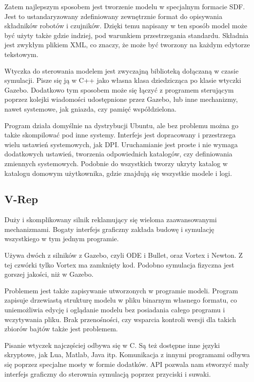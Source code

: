 Zatem najlepszym sposobem jest tworzenie modelu w specjalnym formacie SDF. Jest to ustandaryzowany zdefiniowany zewnętrznie format do opisywania składników robotów i czujników.
Dzięki temu napisany w ten sposób model może być użyty także gdzie indziej, pod warunkiem przestrzegania standardu.
Składnia jest zwykłym plikiem XML, co znaczy, że może być tworzony na każdym edytorze tekstowym.

Wtyczka do sterowania modelem jest zwyczajną biblioteką dołączaną w czasie symulacji. 
Pisze się ją w C++ jako własna klasa dziedzicząca po klasie wtyczki Gazebo.
Dodatkowo tym sposobem może się łączyć z programem sterującym poprzez kolejki wiadomości udostępnione przez Gazebo, lub inne mechanizmy, nawet systemowe, jak gniazda, czy pamięć współdzielona.

Program działa domyślnie na dystrybucji Ubuntu, ale bez problemu można go także skompilować pod inne systemy.
Interfejs jest dopracowany i przestrzega wielu ustawień systemowych, jak DPI.
Uruchamianie jest proste i nie wymaga dodatkowych ustawień, tworzenia odpowiednich katalogów, czy definiowania zmiennych systemowych.
Podobnie do wszystkich tworzy ukryty katalog w katalogu domowym użytkownika, gdzie znajdują się wszystkie modele i logi.

\subsection{V-Rep}
Duży i skomplikowany silnik reklamujący się wieloma zaawansowanymi mechanizmami.
Bogaty interfejs graficzny zakłada budowę i symulację wszystkiego w tym jednym programie.

Używa dwóch z silników z Gazebo, czyli ODE i Bullet, oraz Vortex i Newton. Z tej czwórki tylko Vortex ma zamknięty kod.
Podobno symulacja fizyczna jest gorszej jakości, niż w Gazebo.

Problemem jest także zapisywanie utworzonych w programie modeli.
Program zapisuje drzewiastą strukturę modelu w pliku binarnym własnego formatu, co uniemożliwia edycję i oglądanie modelu bez posiadania całego programu i wczytywania pliku.
Brak przenośności, czy wsparcia kontroli wersji dla takich zbiorów bajtów także jest problemem.

Pisanie wtyczek najczęściej odbywa się w C. Są też dostępne inne języki skryptowe, jak Lua, Matlab, Java itp.
Komunikacja z innymi programami odbywa się poprzez specjalne mosty w formie dodatków.
API pozwala nam stworzyć mały interfejs graficzny do sterownia symulacją poprzez przyciski i suwaki.

